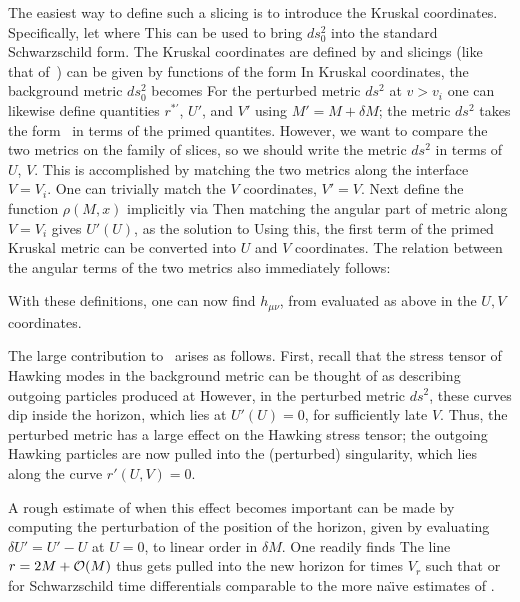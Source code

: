 The easiest way to define such a slicing is to introduce the Kruskal coordinates.  Specifically, let 
%
\eqn{}
%
where 
%
\eqn{}
%
This can be used to bring $ds_0^2$ into the standard Schwarzschild form.  The Kruskal coordinates are defined by
%
\eqn{}
%
and slicings (like that of~) can be given by functions of the form 
%
\eqn{}
%
In Kruskal coordinates, the background metric $ds_0^2$ becomes
%
\eqn{}
%
For the perturbed metric $ds^2$ at $v>v_i$ one can likewise define quantities $r^{*\prime}$, $U'$, and $V'$ using $M'=M+\delta M$; the metric $ds^2$ takes the form \kruskmet\ in terms of the primed quantites.  However, we want to compare the two metrics on the family of slices, so we should write the metric $ds^2$ in terms of $U$, $V$.  This is accomplished by matching the two metrics along the interface $V=V_i$.  One can trivially match the $V$ coordinates, $V'=V$.  Next define the function $\rho(M,x)$ implicitly via
%
\eqn{}
%
Then matching the angular part of  metric along $V=V_i$ gives $U'(U)$, as the solution to
%
\eqn{}
%
Using this, the first term of the primed Kruskal metric can be converted into $U$ and $V$ coordinates.
The relation between the angular terms of the two metrics also immediately follows:
%
\eqn{}
%


With these definitions, one can now find $h_{\mu\nu}$, from
%
\eqn{}
%
evaluated as above in the $U,V$ coordinates.  

The large contribution to \treeM\ arises as follows.  First, recall that the stress tensor of Hawking modes in the background metric can be thought of as describing outgoing particles produced at 
%
\eqn{}
%
However, in the perturbed metric $ds^2$, these curves dip inside the horizon, which lies at $U'(U)=0$, for sufficiently late $V$.  Thus, the perturbed metric has a large effect on the Hawking stress tensor; the outgoing Hawking particles are now pulled into the (perturbed) singularity, which lies along the curve $r'(U,V)=0$.  

A rough estimate of when this effect becomes important can be made by computing the perturbation of the position of the horizon, given by evaluating $\delta U' = U'-U$ at $U=0$, to linear order in $\delta M$.  One readily finds 
%
\eqn{}
%
The line $r=2M +{\cal O}(M)$ thus gets pulled into the new horizon for times $V_r$ such that 
%
\eqn{}
%
or for Schwarzschild time differentials 
%
\eqn{}
%
comparable to the more na\"\i ve estimates of \SGnonloc.

